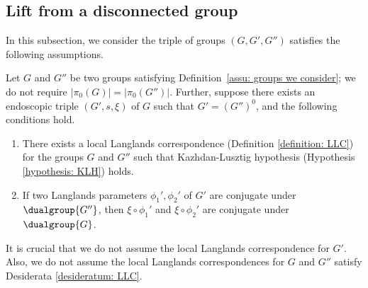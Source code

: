 \documentclass[11pt,letterpaper]{amsart}
\numberwithin{equation}{section}
\begin{document}
\subsection{Lift from a disconnected group}
In this subsection, we consider the triple of groups $(G,G',G'')$ satisfies the following assumptions.
\begin{assu}\label{assu G G' G''}
Let $G$ and $G''$ be two groups satisfying Definition~\ref{assu: groups we consider}; we do not require $|\pi_0(G)|=|\pi_0(G'')|$. 
Further, suppose there exists an endoscopic triple $(G',s, \xi)$ of $G$ such that $G'= (G'')^{0}$, and the following conditions hold.
\begin{enumerate}
    \item [(i)] There exists a local Langlands correspondence (Definition \ref{definition: LLC}) for the groups $G$ and $G''$ such that Kazhdan-Lusztig hypothesis (Hypothesis \ref{hypothesis: KLH}) holds.
    \item [(ii)] If two Langlands parameters $\phi_1', \phi_2'$ of $G'$ are conjugate under $\dualgroup{G''}$, then $\xi \circ \phi_1'$ and $\xi\circ \phi_2'$ are conjugate under $\dualgroup{G}$.
\end{enumerate}
\end{assu}
\begin{remark}
    It is crucial that we do not assume the local Langlands correspondence for $G'$. Also, we do not assume the local Langlands correspondences for $G$ and $G''$ satisfy Desiderata \ref{desideratum: LLC}.
\end{remark}
\end{document}
